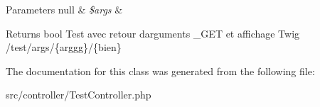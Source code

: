 \begin{DoxyParams}[1]{Parameters}
null & {\em \$args} & \\
\hline
\end{DoxyParams}
\begin{DoxyReturn}{Returns}
bool Test avec retour d\textquotesingle{}arguments \+\_\+\+G\+ET et affichage Twig  /test/args/\{arggg\}/\{bien\} 
\end{DoxyReturn}


The documentation for this class was generated from the following file\+:\begin{DoxyCompactItemize}
\item 
src/controller/Test\+Controller.\+php\end{DoxyCompactItemize}

